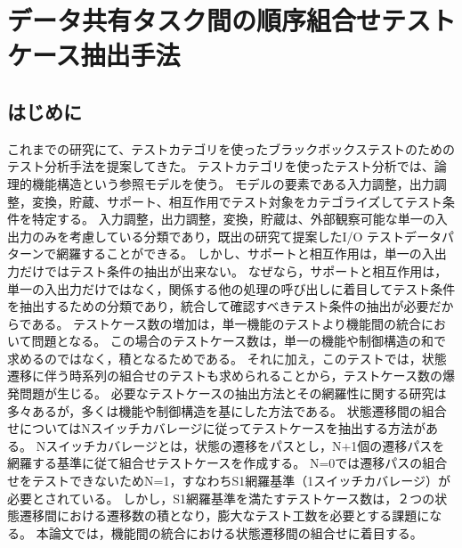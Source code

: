 \documentclass[a4paper,12pt]{jreport}
\begin{document}



\chapter{データ共有タスク間の順序組合せテストケース抽出手法}

\section{はじめに}
これまでの研究にて、テストカテゴリを使ったブラックボックステストのためのテスト分析手法を提案してきた。
テストカテゴリを使ったテスト分析では、論理的機能構造という参照モデルを使う。
モデルの要素である入力調整，出力調整，変換，貯蔵、サポート、相互作用でテスト対象をカテゴライズしてテスト条件を特定する。
入力調整，出力調整，変換，貯蔵は、外部観察可能な単一の入出力のみを考慮している分類であり，既出の研究て提案したI/O テストデータパターンで網羅することができる。
しかし、サポートと相互作用は，単一の入出力だけではテスト条件の抽出が出来ない。
なぜなら，サポートと相互作用は，単一の入出力だけではなく，関係する他の処理の呼び出しに着目してテスト条件を抽出するための分類であり，統合して確認すべきテスト条件の抽出が必要だからである。
テストケース数の増加は，単一機能のテストより機能間の統合において問題となる。
この場合のテストケース数は，単一の機能や制御構造の和で求めるのではなく，積となるためである。
それに加え，このテストでは，状態遷移に伴う時系列の組合せのテストも求められることから，テストケース数の爆発問題が生じる。
必要なテストケースの抽出方法とその網羅性に関する研究は多々あるが，多くは機能や制御構造を基にした方法である\cite{Myers,Lee,Grinda,Ostrand}。
状態遷移間の組合せについてはNスイッチカバレージに従ってテストケースを抽出する方法がある。
Nスイッチカバレージとは，状態の遷移をパスとし，N+1個の遷移パスを網羅する基準に従て組合せテストケースを作成する。
N=0では遷移パスの組合せをテストできないためN=1，すなわちS1網羅基準（1スイッチカバレージ）が必要とされている\cite{Beizer}。
しかし，S1網羅基準を満たすテストケース数は，２つの状態遷移間における遷移数の積となり，膨大なテスト工数を必要とする課題になる。
本論文では，機能間の統合における状態遷移間の組合せに着目する。
\end{document}
